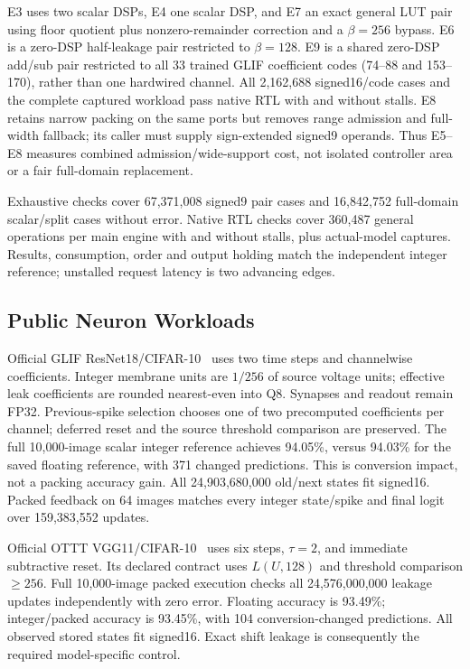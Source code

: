 \documentclass[conference]{IEEEtran}
\begin{document}
E3 uses two scalar DSPs, E4 one scalar DSP, and E7 an exact general LUT pair using floor quotient plus nonzero-remainder correction and a $\beta=256$ bypass. E6 is a zero-DSP half-leakage pair restricted to $\beta=128$. E9 is a shared zero-DSP add/sub pair restricted to all 33 trained GLIF coefficient codes (74--88 and 153--170), rather than one hardwired channel. All 2,162,688 signed16/code cases and the complete captured workload pass native RTL with and without stalls. E8 retains narrow packing on the same ports but removes range admission and full-width fallback; its caller must supply sign-extended signed9 operands. Thus E5--E8 measures combined admission/wide-support cost, not isolated controller area or a fair full-domain replacement.

Exhaustive checks cover 67,371,008 signed9 pair cases and 16,842,752 full-domain scalar/split cases without error. Native RTL checks cover 360,487 general operations per main engine with and without stalls, plus actual-model captures. Results, consumption, order and output holding match the independent integer reference; unstalled request latency is two advancing edges.

\subsection{Public Neuron Workloads}
Official GLIF ResNet18/CIFAR-10~\cite{glif} uses two time steps and channelwise coefficients. Integer membrane units are $1/256$ of source voltage units; effective leak coefficients are rounded nearest-even into Q8. Synapses and readout remain FP32. Previous-spike selection chooses one of two precomputed coefficients per channel; deferred reset and the source threshold comparison are preserved. The full 10,000-image scalar integer reference achieves 94.05\%, versus 94.03\% for the saved floating reference, with 371 changed predictions. This is conversion impact, not a packing accuracy gain. All 24,903,680,000 old/next states fit signed16. Packed feedback on 64 images matches every integer state/spike and final logit over 159,383,552 updates.

Official OTTT VGG11/CIFAR-10~\cite{ottt} uses six steps, $\tau=2$, and immediate subtractive reset. Its declared contract uses $L(U, 128)$ and threshold comparison $\ge256$. Full 10,000-image packed execution checks all 24,576,000,000 leakage updates independently with zero error. Floating accuracy is 93.49\%; integer/packed accuracy is 93.45\%, with 104 conversion-changed predictions. All observed stored states fit signed16. Exact shift leakage is consequently the required model-specific control.
\end{document}
